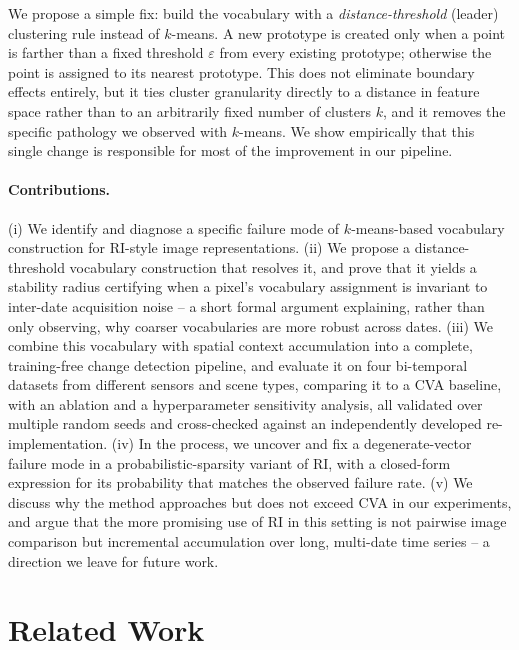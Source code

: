 \documentclass[11pt]{article}
\begin{document}
We propose a simple fix: build the vocabulary with a \emph{distance-threshold} (leader) clustering rule instead of $k$-means. A new prototype is created only when a point is farther than a fixed threshold $\varepsilon$ from every existing prototype; otherwise the point is assigned to its nearest prototype. This does not eliminate boundary effects entirely, but it ties cluster granularity directly to a distance in feature space rather than to an arbitrarily fixed number of clusters $k$, and it removes the specific pathology we observed with $k$-means. We show empirically that this single change is responsible for most of the improvement in our pipeline.

\paragraph{Contributions.} (i) We identify and diagnose a specific failure mode of $k$-means-based vocabulary construction for RI-style image representations. (ii) We propose a distance-threshold vocabulary construction that resolves it, and prove that it yields a stability radius certifying when a pixel's vocabulary assignment is invariant to inter-date acquisition noise -- a short formal argument explaining, rather than only observing, why coarser vocabularies are more robust across dates. (iii) We combine this vocabulary with spatial context accumulation into a complete, training-free change detection pipeline, and evaluate it on four bi-temporal datasets from different sensors and scene types, comparing it to a CVA baseline, with an ablation and a hyperparameter sensitivity analysis, all validated over multiple random seeds and cross-checked against an independently developed re-implementation. (iv) In the process, we uncover and fix a degenerate-vector failure mode in a probabilistic-sparsity variant of RI, with a closed-form expression for its probability that matches the observed failure rate. (v) We discuss why the method approaches but does not exceed CVA in our experiments, and argue that the more promising use of RI in this setting is not pairwise image comparison but incremental accumulation over long, multi-date time series -- a direction we leave for future work.

\section{Related Work}
\label{sec:related-work}
\end{document}
